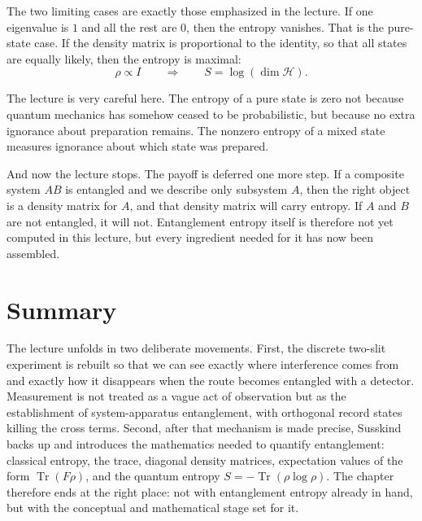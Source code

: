 The two limiting cases are exactly those emphasized in the lecture. If one eigenvalue is \(1\) and all the rest are \(0\), then the entropy vanishes. That is the pure-state case. If the density matrix is proportional to the identity, so that all states are equally likely, then the entropy is maximal:
\begin{equation}
\rho \propto I
\qquad \Longrightarrow \qquad
S=\log(\dim \mathcal H) .
\end{equation}

The lecture is very careful here. The entropy of a pure state is zero not because quantum mechanics has somehow ceased to be probabilistic, but because no extra ignorance about preparation remains. The nonzero entropy of a mixed state measures ignorance about which state was prepared.

And now the lecture stops. The payoff is deferred one more step. If a composite system \(AB\) is entangled and we describe only subsystem \(A\), then the right object is a density matrix for \(A\), and that density matrix will carry entropy. If \(A\) and \(B\) are not entangled, it will not. Entanglement entropy itself is therefore not yet computed in this lecture, but every ingredient needed for it has now been assembled.

\section{Summary}

The lecture unfolds in two deliberate movements. First, the discrete two-slit experiment is rebuilt so that we can see exactly where interference comes from and exactly how it disappears when the route becomes entangled with a detector. Measurement is not treated as a vague act of observation but as the establishment of system-apparatus entanglement, with orthogonal record states killing the cross terms. Second, after that mechanism is made precise, Susskind backs up and introduces the mathematics needed to quantify entanglement: classical entropy, the trace, diagonal density matrices, expectation values of the form \(\operatorname{Tr}(F\rho)\), and the quantum entropy \(S=-\operatorname{Tr}(\rho\log\rho)\). The chapter therefore ends at the right place: not with entanglement entropy already in hand, but with the conceptual and mathematical stage set for it.